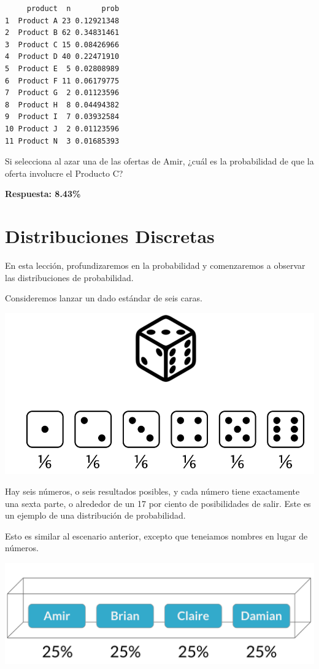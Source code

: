 \documentclass[
  letterpaper,
  DIV=11,
  numbers=noendperiod]{scrreprt}
\begin{document}
\begin{verbatim}
     product  n       prob
1  Product A 23 0.12921348
2  Product B 62 0.34831461
3  Product C 15 0.08426966
4  Product D 40 0.22471910
5  Product E  5 0.02808989
6  Product F 11 0.06179775
7  Product G  2 0.01123596
8  Product H  8 0.04494382
9  Product I  7 0.03932584
10 Product J  2 0.01123596
11 Product N  3 0.01685393
\end{verbatim}

Si selecciona al azar una de las ofertas de Amir, ¿cuál es la
probabilidad de que la oferta involucre el Producto C?

\textbf{Respuesta: 8.43\%}

\hypertarget{distribuciones-discretas}{%
\section{Distribuciones Discretas}\label{distribuciones-discretas}}

En esta lección, profundizaremos en la probabilidad y comenzaremos a
observar las distribuciones de probabilidad.

Consideremos lanzar un dado estándar de seis caras.

\includegraphics{fig18.png}

Hay seis números, o seis resultados posibles, y cada número tiene
exactamente una sexta parte, o alrededor de un 17 por ciento de
posibilidades de salir. Este es un ejemplo de una distribución de
probabilidad.

Esto es similar al escenario anterior, excepto que teneiamos nombres en
lugar de números.

\includegraphics{fig19.png}
\end{document}
